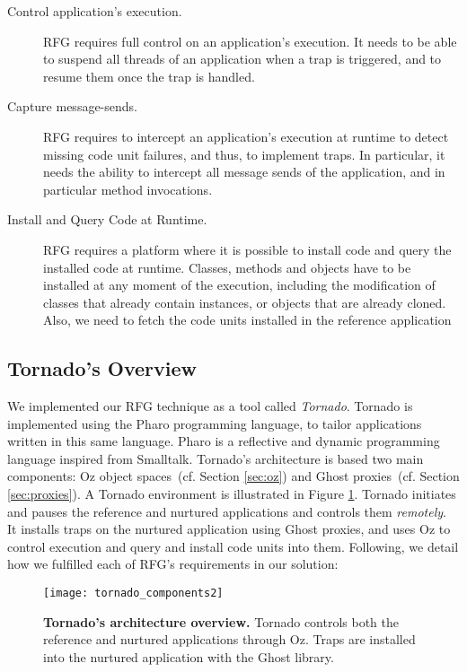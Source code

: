 \begin{description}
\item[Control application's execution.] RFG requires full control on an application's execution. It needs to be able to suspend all threads of an application when a trap is triggered, and to resume them once the trap is handled.

\item[Capture message-sends.] RFG requires to intercept an application's execution at runtime to detect missing code unit failures, and thus, to implement traps. In particular, it needs the ability to intercept all message sends of the application, and in particular method invocations.

\item[Install and Query Code at Runtime.] RFG requires a platform where it is possible to install code and query the installed code at runtime. Classes, methods and objects have to be installed at any moment of the execution, including the modification of classes that already contain instances, or objects that are already cloned. Also, we need to fetch the code units installed in the reference application 
\end{description}

\subsection{Tornado's Overview}\label{sec:infrastructure}

We implemented our RFG technique as a tool called \emph{Tornado}. Tornado is implemented using the Pharo programming language, to tailor applications written in this same language. Pharo is a reflective and dynamic programming language inspired from Smalltalk. Tornado's architecture is based two main components: Oz object spaces~(cf. Section \ref{sec:oz}) and Ghost proxies~(cf. Section \ref{sec:proxies}). A Tornado environment is illustrated in Figure \ref{fig:tornado_code units}. Tornado initiates and pauses the reference and nurtured applications and controls them \emph{remotely}. It installs traps on the nurtured application using Ghost proxies, and uses Oz to control execution and query and install code units into them. Following, we detail how we fulfilled each of RFG's requirements in our solution:

\begin{figure}[ht]
\begin{center}
\texttt{[image: tornado\_components2]}
\caption{\small\textbf{Tornado's architecture overview.} Tornado controls both the reference and nurtured applications through Oz. Traps are installed into the nurtured application with the Ghost library.\label{fig:tornado_code units}}
\end{center}
\end{figure}

